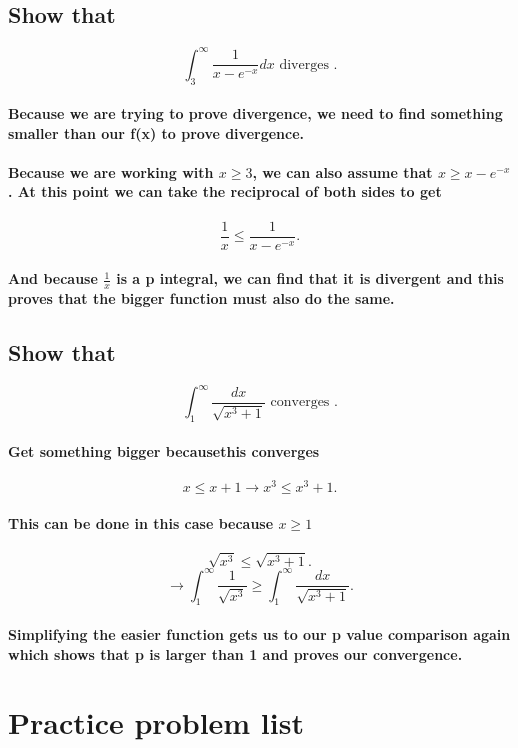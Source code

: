 \documentclass[a4paper]{article}
\begin{document}
\subsection{Show that }%
\label{sub:Show that }
\[
\int_{3}^{\infty} \frac{1}{x-e^{-x}}dx \text{ diverges }
.\] 
\paragraph{Because we are trying to prove divergence, we need to find something smaller than our f(x) to prove divergence.  }
\paragraph{Because we are working with $x\ge 3$, we can also assume that $x\ge x-e^{-x}$. At this point we can take the reciprocal of both sides to get}

\[
\frac{1}{x}\le \frac{1}{x-e^{-x}}
.\] 
\paragraph{And because $\frac{1}{x}$ is a p integral, we can find that it is divergent and this proves that the bigger function must also do the same. }
\newpage
\subsection{Show that}%
\label{sub:Show that}
\[
  \int_{1}^{\infty} \frac{dx}{\sqrt{x^3+1}} \text{ converges }
.\]
\paragraph{Get something bigger becausethis converges}
\[
x\le x+1 \to x^3\le x^3+1 
.\]   
\paragraph{This can be done in this case because $x\ge 1$}
\[
\sqrt{x^3}\le \sqrt{x^3+1}
.\] 
\[
  \to \int_{1}^{\infty} \frac{1}{\sqrt{x^3}}\ge \int_{1}^{\infty} \frac{dx}{\sqrt{x^3+1}}
.\] 
\paragraph{Simplifying the easier function gets us to our p value comparison again which shows that p is larger than 1 and proves our convergence. }
\section{Practice problem list}%
\label{sec:Practice problem list}
\end{document}
